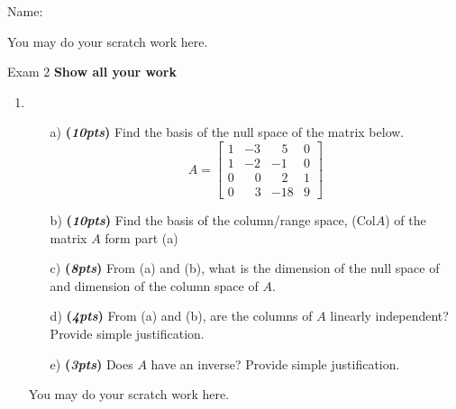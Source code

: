 \documentclass[12pt]{article}%
\begin{document}
Name:\hrulefill

\newpage
You may do your scratch work here.
\newpage

Exam 2 \hfill \textbf{Show all your work}
\\
\HRule


\begin{enumerate}     
    \item 
    \begin{itemize}
        \item[a)] \textbf{(\emph{10pts})} Find the basis of the null space of the matrix below. 
        \[
        A = \begin{bmatrix}
            1 & -3 & \;\;\;5 & 0\\
            1 & -2 & -1 & 0\\
            0 & \;\;\;0 & \;\;\;2 &  1\\
            0 & \;\;\;3 & -18 & 9 
        \end{bmatrix}
        \]
        
        \vspace{5cm}

         \item[b)] \textbf{(\emph{10pts})} Find the basis of the column/range space, (Col\(A\)) of the matrix \(A\) form part (a)
        
        \vspace{3cm}

        \item[c)]\textbf{(\emph{8pts})} From (a) and (b), what is the dimension of the  null space of  and dimension of the column space of \(A\).
        \vspace{3cm}
        
        \item[d)]\textbf{(\emph{4pts})} From (a) and (b), are the columns of \(A\) linearly independent?  Provide simple justification.
        \vspace{3cm}
        
        \item[e)]\textbf{(\emph{3pts})} Does \(A\) have an inverse? Provide simple justification.
    \end{itemize}
    
     \newpage
     You may do your scratch work here.
    
    \newpage



\end{enumerate}
\end{document}
